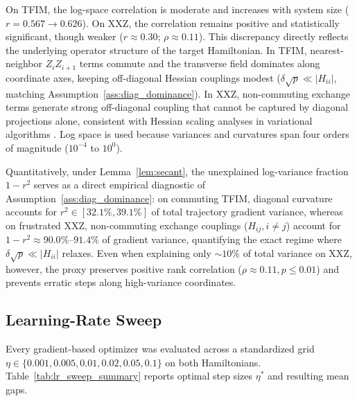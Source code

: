 \documentclass[11pt,a4paper]{article}
\begin{document}
On TFIM, the log-space correlation is moderate and increases with system size ($r = 0.567 \to 0.626$). On XXZ, the correlation remains positive and statistically significant, though weaker ($r \approx 0.30$; $\rho \approx 0.11$). This discrepancy directly reflects the underlying operator structure of the target Hamiltonian. In TFIM, nearest-neighbor $Z_i Z_{i+1}$ terms commute and the transverse field dominates along coordinate axes, keeping off-diagonal Hessian couplings modest ($\delta \sqrt{p} \ll |H_{ii}|$, matching Assumption~\ref{ass:diag_dominance}). In XXZ, non-commuting exchange terms generate strong off-diagonal coupling that cannot be captured by diagonal projections alone, consistent with Hessian scaling analyses in variational algorithms \cite{hessian_resolvability_2026}. Log space is used because variances and curvatures span four orders of magnitude ($10^{-4}$ to $10^0$). 

Quantitatively, under Lemma~\ref{lem:secant}, the unexplained log-variance fraction $1 - r^2$ serves as a direct empirical diagnostic of Assumption~\ref{ass:diag_dominance}: on commuting TFIM, diagonal curvature accounts for $r^2 \in [32.1\%, 39.1\%]$ of total trajectory gradient variance, whereas on frustrated XXZ, non-commuting exchange couplings ($H_{ij}, i \ne j$) account for $1 - r^2 \approx 90.0\%\text{--}91.4\%$ of gradient variance, quantifying the exact regime where $\delta\sqrt{p} \ll |H_{ii}|$ relaxes. Even when explaining only $\sim 10\%$ of total variance on XXZ, however, the proxy preserves positive rank correlation ($\rho \approx 0.11, p \le 0.01$) and prevents erratic steps along high-variance coordinates.

\FloatBarrier

\subsection{Learning-Rate Sweep}
\label{sec:lr_sweep_results}
Every gradient-based optimizer was evaluated across a standardized grid $\eta \in \{0.001, 0.005, 0.01, 0.02, 0.05, 0.1\}$ on both Hamiltonians. Table~\ref{tab:lr_sweep_summary} reports optimal step sizes $\eta^*$ and resulting mean gaps.
\end{document}
